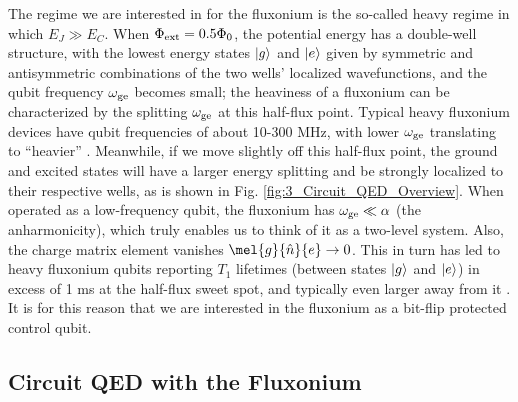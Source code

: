 The regime we are interested in for the fluxonium is the so-called heavy regime in which $E_J \gg E_C$. When $\Phi_{\rm ext} = 0.5\Phi_0$, the potential energy has a double-well structure, with the lowest energy states $\lvert g\rangle$ and $\lvert e\rangle$ given by symmetric and antisymmetric combinations of the two wells' localized wavefunctions, and the qubit frequency $\omega_{\rm ge}$ becomes small; the heaviness of a fluxonium can be characterized by the splitting $\omega_{\rm ge}$ at this half-flux point. Typical heavy fluxonium devices have qubit frequencies of about 10-300 MHz, with lower $\omega_{\rm ge}$ translating to ``heavier'' \cite{earnest2018realization, zhang2021universal, ding2023FTF}. Meanwhile, if we move slightly off this half-flux point, the ground and excited states will have a larger energy splitting and be strongly localized to their respective wells, as is shown in Fig. \ref{fig:3_Circuit_QED_Overview}. When operated as a low-frequency qubit, the fluxonium has $\omega_{\rm ge} \ll \alpha$ (the anharmonicity), which truly enables us to think of it as a two-level system. Also, the charge matrix element vanishes $\mel{g}{\hat{n}}{e} \to 0$. This in turn has led to heavy fluxonium qubits reporting $T_1$ lifetimes (between states $\lvert g\rangle$ and $\lvert e\rangle$) in excess of 1 ms at the half-flux sweet spot, and typically even larger away from it \cite{earnest2018realization, zhang2021universal, ding2023FTF, nguyen2019high, somoroff2023millisecond}. It is for this reason that we are interested in the fluxonium as a bit-flip protected control qubit. 

\subsection{Circuit QED with the Fluxonium\label{sec:3_Circuit_QED_with_Fluxonium}}

